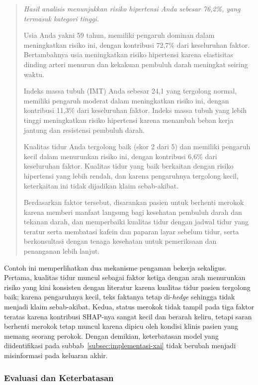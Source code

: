 \begin{quote}
\small\itshape
Hasil analisis menunjukkan risiko hipertensi Anda sebesar 76,2\%, yang termasuk kategori tinggi.

Usia Anda yakni 59 tahun, memiliki pengaruh dominan dalam meningkatkan risiko ini, dengan kontribusi 72,7\% dari keseluruhan faktor. Bertambahnya usia meningkatkan risiko hipertensi karena elastisitas dinding arteri menurun dan kekakuan pembuluh darah meningkat seiring waktu.

Indeks massa tubuh (IMT) Anda sebesar 24,1 yang tergolong normal, memiliki pengaruh moderat dalam meningkatkan risiko ini, dengan kontribusi 11,3\% dari keseluruhan faktor. Indeks massa tubuh yang lebih tinggi meningkatkan risiko hipertensi karena menambah beban kerja jantung dan resistensi pembuluh darah.

Kualitas tidur Anda tergolong baik (skor 2 dari 5) dan memiliki pengaruh kecil dalam menurunkan risiko ini, dengan kontribusi 6,6\% dari keseluruhan faktor. Kualitas tidur yang baik berkaitan dengan risiko hipertensi yang lebih rendah, dan karena pengaruhnya tergolong kecil, keterkaitan ini tidak dijadikan klaim sebab-akibat.

Berdasarkan faktor tersebut, disarankan pasien untuk berhenti merokok karena memberi manfaat langsung bagi kesehatan pembuluh darah dan tekanan darah, dan memperbaiki kualitas tidur dengan jadwal tidur yang teratur serta membatasi kafein dan paparan layar sebelum tidur, serta berkonsultasi dengan tenaga kesehatan untuk pemeriksaan dan penanganan lebih lanjut.
\end{quote}

Contoh ini memperlihatkan dua mekanisme pengaman bekerja sekaligus. Pertama, kualitas tidur muncul sebagai faktor ketiga dengan arah menurunkan risiko yang kini konsisten dengan literatur karena kualitas tidur pasien tergolong baik; karena pengaruhnya kecil, teks faktanya tetap di-\emph{hedge} sehingga tidak menjadi klaim sebab-akibat. Kedua, status merokok tidak tampil pada tiga faktor teratas karena kontribusi SHAP-nya sangat kecil dan berarah keliru, tetapi saran berhenti merokok tetap muncul karena dipicu oleh kondisi klinis pasien yang memang seorang perokok. Dengan demikian, keterbatasan model yang diidentifikasi pada subbab~\ref{subsec:implementasi-xai} tidak berubah menjadi misinformasi pada keluaran akhir.

\subsubsection{Evaluasi dan Keterbatasan}

